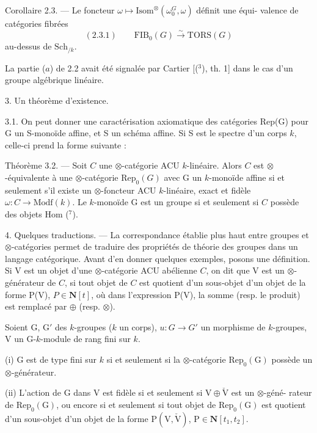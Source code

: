\documentclass[11pt]{article}
\newcommand{\scanpage}[1]{\par\bigskip\noindent{\small\sffamily[scan #1]}\par}
\newcommand{\mspage}[1]{{\small\sffamily[p.\,#1]}}
\newcommand{\hand}[1]{\textcolor{blue}{#1}}
\begin{document}
Corollaire 2.3. --- Le foncteur $\omega \mapsto \mathrm{Isom}^{\otimes}(\omega_0^G, \omega)$ définit une équi-%
valence de catégories fibrées
\[ (2.3.1) \qquad \mathrm{FIB}_0(G) \xrightarrow{\sim} \mathrm{TORS}(G) \]
au-dessus de $\mathrm{Sch}_{/k}$.

La partie ($a$) de 2.2 avait été signalée par Cartier [(${}^3$), th. 1] dans le
cas d'un groupe algébrique linéaire.

3. Un théorème d'existence.

3.1. On peut donner une caractérisation axiomatique des catégories
Rep(G) pour G un S-monoïde affine, et S un schéma affine. Si S est le
spectre d'un corps $k$, celle-ci prend la forme suivante :

Théorème 3.2. --- Soit $C$ une $\otimes$-catégorie ACU $k$-linéaire. Alors $C$ est
$\otimes$-équivalente à une $\otimes$-catégorie $\mathrm{Rep}_0(G)$ avec G un $k$-monoïde affine si
et seulement s'il existe un $\otimes$-foncteur ACU $k$-linéaire, exact et fidèle
$\omega : C \to \mathrm{Modf}(k)$. Le $k$-monoïde G est un groupe si et seulement si $C$ possède
des objets Hom (${}^7$).

4. Quelques traductions. --- La correspondance établie plus haut
entre groupes et $\otimes$-catégories permet de traduire des propriétés de théorie
des groupes dans un langage catégorique. Avant d'en donner quelques
exemples, posons une définition. Si V est un objet d'une $\otimes$-catégorie ACU
abélienne $C$, on dit que V est un $\otimes$-générateur de $C$, si tout objet de $C$
est quotient d'un sous-objet d'un objet de la forme P(V), $P \in \mathbf{N}[t]$, où
dans l'expression P(V), la somme (resp. le produit) est remplacé par $\oplus$
(resp. $\otimes$).

Soient G, G$'$ des $k$-groupes ($k$ un corps), $u : G \to G'$ un morphisme
de $k$-groupes, V un G-$k$-module de rang fini sur $k$.

\mspage{\hand{71}}

\clearpage
\scanpage{119/72}
\mspage{( 4 )}
(i) G est de type fini sur $k$ si et seulement si la $\otimes$-catégorie $\mathrm{Rep}_0(\mathrm{G})$
possède un $\otimes$-générateur.

(ii) L'action de G dans V est fidèle si et seulement si $\mathrm{V}\oplus\check{\mathrm{V}}$ est un $\otimes$-géné-%
rateur de $\mathrm{Rep}_0(\mathrm{G})$, ou encore si et seulement si tout objet de $\mathrm{Rep}_0(\mathrm{G})$ est
quotient d'un sous-objet d'un objet de la forme $\mathrm{P}(\mathrm{V},\check{\mathrm{V}})$, $\mathrm{P}\in\mathbf{N}[t_1, t_2]$.
\end{document}

